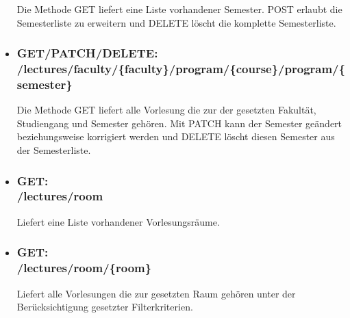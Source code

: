 \begin{itemize}
Die Methode GET liefert eine Liste vorhandener Semester. POST erlaubt die Semesterliste zu erweitern und DELETE löscht die komplette Semesterliste.
\item \subsubsection{GET/PATCH/DELETE:\\ /lectures/faculty/\{faculty\}/program/\{course\}/program/\{semester\}} 
Die Methode GET liefert alle Vorlesung die zur der gesetzten Fakultät, Studiengang und Semester gehören. Mit PATCH kann der Semester geändert beziehungsweise korrigiert werden und DELETE löscht diesen Semester aus der Semesterliste.

\item \subsubsection{GET:\\ /lectures/room} 
Liefert eine Liste vorhandener Vorlesungsräume.
\item \subsubsection{GET:\\ /lectures/room/\{room\}} 
Liefert alle Vorlesungen die zur gesetzten Raum gehören unter der Berücksichtigung gesetzter Filterkriterien.


\end{itemize}
